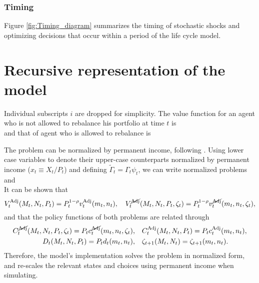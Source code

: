 \documentclass[./RiskyContrib.tex]{subfiles}
\begin{document}
\subsubsection{Timing}



Figure \ref{fig:Timing_diagram} summarizes the timing of stochastic shocks and
optimizing decisions that occur within a period of the life cycle model.

\hypertarget{Recursive}{}
\section{Recursive representation of the model}\label{sec:recursive}

Individual subscripts $i$ are dropped for simplicity. The value function for
an agent who is not allowed to rebalance his portfolio at time $t$ is
\begin{equation*}
    
\end{equation*}
and that of agent who is allowed to rebalance is
\begin{equation*}
    
\end{equation*}

The problem can be normalized by permanent income, following
\cite{Carroll2020solvingmicrodsops}. Using lower case variables to
denote their upper-case counterparts normalized by permanent income ($x_t \equiv X_t/P_t$)
and defining $\tilde{\Gamma}_t = \Gamma_{t}\psi_{t}$, we can write
normalized problems
\begin{equation}\label{eq:bellman_NAdj_norm}

\end{equation}
and
\begin{equation}\label{eq:bellman_Adj_norm}

\end{equation}
It can be shown that
\begin{equation*}
V_{t}^{\text{Adj}}(M_t,N_t,P_t) = P_t^{1-\rho} v_{t}^{\text{Adj}}(m_t,n_t), \quad
V_{t}^{\cancel{\text{Adj}}}(M_t,N_t,P_t,\zeta_t) = P_t^{1-\rho} v_{t}^{\cancel{\text{Adj}}}(m_t,n_t,\zeta_t),
\end{equation*}
and that the policy functions of both problems are related through
\begin{equation*}
\begin{split}
C_t^{\cancel{\text{Adj}}}(M_t,N_t,P_t,\zeta_t) = P_t c_t^{\cancel{\text{Adj}}}(m_t,n_t,\zeta_t),& \quad C_t^{\text{Adj}}(M_t,N_t,P_t) = P_t c_t^{\text{Adj}}(m_t,n_t),\\
D_t(M_t,N_t,P_t) = P_t d_t(m_t,n_t),& \quad \zeta_{t+1}(M_t,N_t) = \zeta_{t+1}(m_t,n_t).
\end{split}
\end{equation*}
Therefore, the model's implementation solves the problem in normalized form, and re-scales
the relevant states and choices using permanent income when simulating.
\end{document}
